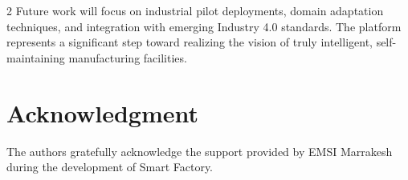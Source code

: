 \documentclass{ijceds} %
\begin{document}
\begin{multicols}{2}
Future work will focus on industrial pilot deployments, domain adaptation techniques, and integration with emerging Industry 4.0 standards. The platform represents a significant step toward realizing the vision of truly intelligent, self-maintaining manufacturing facilities.


\section*{Acknowledgment}

The authors gratefully acknowledge the support provided by EMSI Marrakesh during the development of Smart Factory.





\end{multicols}
\end{document}
